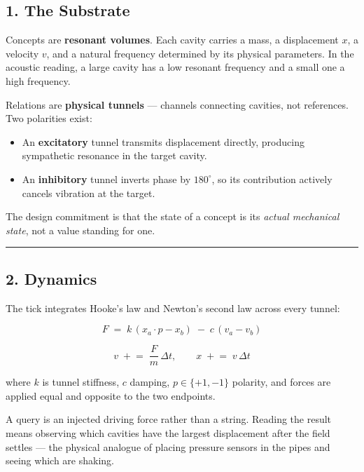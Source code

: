 \documentclass[
  11pt,
  a4paper,
]{article}
\providecommand{\tightlist}{%
  \setlength{\itemsep}{0pt}\setlength{\parskip}{0pt}}
\begin{document}
\subsection{1. The Substrate}\label{the-substrate}

Concepts are \textbf{resonant volumes}. Each cavity carries a mass, a
displacement \(x\), a velocity \(v\), and a natural frequency determined
by its physical parameters. In the acoustic reading, a large cavity has
a low resonant frequency and a small one a high frequency.

Relations are \textbf{physical tunnels} --- channels connecting
cavities, not references. Two polarities exist:

\begin{itemize}
\tightlist
\item
  An \textbf{excitatory} tunnel transmits displacement directly,
  producing sympathetic resonance in the target cavity.
\item
  An \textbf{inhibitory} tunnel inverts phase by \(180^\circ\), so its
  contribution actively cancels vibration at the target.
\end{itemize}

The design commitment is that the state of a concept is its \emph{actual
mechanical state}, not a value standing for one.

\begin{center}\rule{0.5\linewidth}{0.5pt}\end{center}

\subsection{2. Dynamics}\label{dynamics}

The tick integrates Hooke's law and Newton's second law across every
tunnel:

\[
F \;=\; k\,(x_a \cdot p - x_b)\;-\;c\,(v_a - v_b)
\]

\[
v \;\mathrel{+}=\; \frac{F}{m}\,\Delta t,
\qquad
x \;\mathrel{+}=\; v\,\Delta t
\]

where \(k\) is tunnel stiffness, \(c\) damping, \(p \in \{+1,-1\}\)
polarity, and forces are applied equal and opposite to the two
endpoints.

A query is an injected driving force rather than a string. Reading the
result means observing which cavities have the largest displacement
after the field settles --- the physical analogue of placing pressure
sensors in the pipes and seeing which are shaking.
\end{document}
